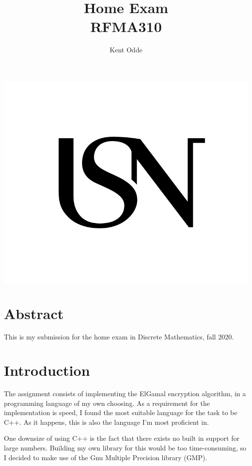\documentclass{article}
\begin{document}
\author{Kent Odde}
\title{Home Exam\\RFMA310}

\maketitle
\thispagestyle{empty}
\begin{center}
\includegraphics[width=\linewidth,height=0.2\textheight,keepaspectratio]{img/USN.png}
\end{center}
\newpage

\tableofcontents

\newpage

\section{Abstract}
This is my submission for the home exam in Discrete Mathematics, fall 2020.

\section{Introduction}
The assignment consists of implementing the ElGamal encryption algorithm, in a programming language of my own choosing. As a requirement for the implementation is speed, I found the most suitable language for the task to be C++. As it happens, this is also the language I'm most proficient in.

One downsize of using C++ is the fact that there exists no built in support for large numbers. Building my own library for this would be too time-consuming, so I decided to make use of the Gnu Multiple Precision library (GMP)\cite{GMP}.
\end{document}
